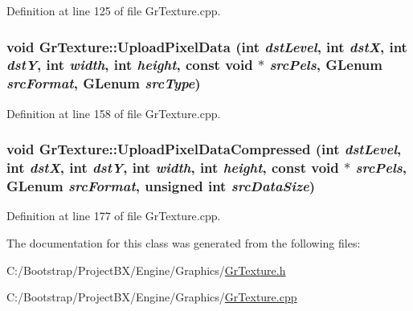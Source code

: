 Definition at line 125 of file GrTexture.cpp.\hypertarget{class_gr_texture_3cd234effbf7e79d1c82031ff842c69c}{
\subsubsection[{UploadPixelData}]{\setlength{\rightskip}{0pt plus 5cm}void GrTexture::UploadPixelData (int {\em dstLevel}, \/  int {\em dstX}, \/  int {\em dstY}, \/  int {\em width}, \/  int {\em height}, \/  const void $\ast$ {\em srcPels}, \/  GLenum {\em srcFormat}, \/  GLenum {\em srcType})}}
\label{class_gr_texture_3cd234effbf7e79d1c82031ff842c69c}




Definition at line 158 of file GrTexture.cpp.\hypertarget{class_gr_texture_b1deb448c9ae51a1c6b06997e7ffba0f}{
\subsubsection[{UploadPixelDataCompressed}]{\setlength{\rightskip}{0pt plus 5cm}void GrTexture::UploadPixelDataCompressed (int {\em dstLevel}, \/  int {\em dstX}, \/  int {\em dstY}, \/  int {\em width}, \/  int {\em height}, \/  const void $\ast$ {\em srcPels}, \/  GLenum {\em srcFormat}, \/  unsigned int {\em srcDataSize})}}
\label{class_gr_texture_b1deb448c9ae51a1c6b06997e7ffba0f}




Definition at line 177 of file GrTexture.cpp.

The documentation for this class was generated from the following files:\begin{CompactItemize}
\item 
C:/Bootstrap/ProjectBX/Engine/Graphics/\hyperlink{_gr_texture_8h}{GrTexture.h}\item 
C:/Bootstrap/ProjectBX/Engine/Graphics/\hyperlink{_gr_texture_8cpp}{GrTexture.cpp}\end{CompactItemize}
